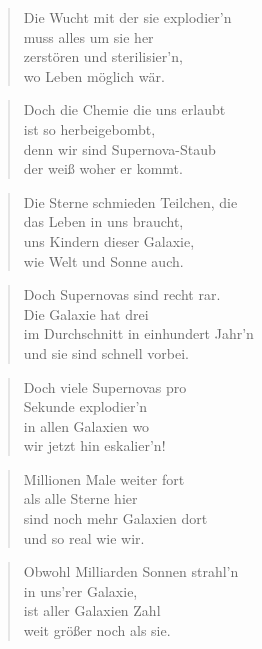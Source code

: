\documentclass[10pt,a4paper]{article}
\begin{document}
\begin{multicols}{2}
\begin{verse}
Die Wucht mit der sie explodier’n \\
muss alles um sie her \\
zerstören und sterilisier’n, \\
wo Leben möglich wär. \\
\end{verse}

\begin{verse}
Doch die Chemie die uns erlaubt \\
ist so herbeigebombt, \\
denn wir sind Supernova-Staub \\
der weiß woher er kommt. \\
\end{verse}

\begin{verse}
Die Sterne schmieden Teilchen, die \\
das Leben in uns braucht, \\
uns Kindern dieser Galaxie, \\
wie Welt und Sonne auch. \\
\end{verse}

\begin{verse}
Doch Supernovas sind recht rar. \\
Die Galaxie hat drei \\
im Durchschnitt in einhundert Jahr’n \\
und sie sind schnell vorbei. \\
\end{verse}

\begin{verse}
Doch viele Supernovas pro \\
Sekunde explodier’n \\
in allen Galaxien wo \\
wir jetzt hin eskalier’n! \\
\end{verse}

\begin{verse}
Millionen Male weiter fort \\
als alle Sterne hier \\
sind noch mehr Galaxien dort \\
und so real wie wir. \\
\end{verse}

\begin{verse}
Obwohl Milliarden Sonnen strahl’n \\
in uns’rer Galaxie, \\
ist aller Galaxien Zahl \\
weit größer noch als sie. \\
\end{verse}


\end{multicols}
\end{document}
